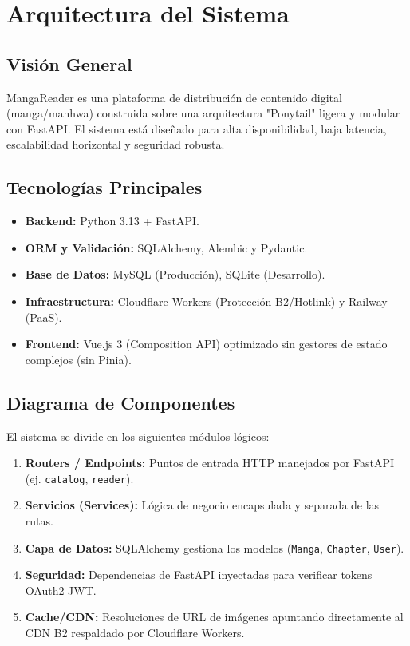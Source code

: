 \section{Arquitectura del Sistema}

\subsection{Visión General}
MangaReader es una plataforma de distribución de contenido digital (manga/manhwa) construida sobre una arquitectura "Ponytail" ligera y modular con FastAPI. El sistema está diseñado para alta disponibilidad, baja latencia, escalabilidad horizontal y seguridad robusta.

\subsection{Tecnologías Principales}
\begin{itemize}
    \item \textbf{Backend:} Python 3.13 + FastAPI.
    \item \textbf{ORM y Validación:} SQLAlchemy, Alembic y Pydantic.
    \item \textbf{Base de Datos:} MySQL (Producción), SQLite (Desarrollo).
    \item \textbf{Infraestructura:} Cloudflare Workers (Protección B2/Hotlink) y Railway (PaaS).
    \item \textbf{Frontend:} Vue.js 3 (Composition API) optimizado sin gestores de estado complejos (sin Pinia).
\end{itemize}

\subsection{Diagrama de Componentes}
El sistema se divide en los siguientes módulos lógicos:
\begin{enumerate}
    \item \textbf{Routers / Endpoints:} Puntos de entrada HTTP manejados por FastAPI (ej. \texttt{catalog}, \texttt{reader}).
    \item \textbf{Servicios (Services):} Lógica de negocio encapsulada y separada de las rutas.
    \item \textbf{Capa de Datos:} SQLAlchemy gestiona los modelos (\texttt{Manga}, \texttt{Chapter}, \texttt{User}).
    \item \textbf{Seguridad:} Dependencias de FastAPI inyectadas para verificar tokens OAuth2 JWT.
    \item \textbf{Cache/CDN:} Resoluciones de URL de imágenes apuntando directamente al CDN B2 respaldado por Cloudflare Workers.
\end{enumerate}

